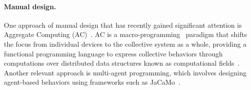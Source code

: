 \documentclass[12pt]{article}
\begin{document}
\paragraph{Manual design.}
One approach of manual design that has recently gained significant attention is 
 Aggregate Computing (AC)~\cite{DBLP:journals/jlap/ViroliBDACP19}. 
% 
AC is a macro-programming~\cite{DBLP:journals/csur/Casadei23} paradigm that shifts the focus from individual 
 devices to the collective system as a whole, providing a functional programming language to express collective 
 behaviors through computations over distributed data structures 
 known as computational fields~\cite{DBLP:journals/pervasive/MameiZL04,DBLP:journals/jlap/ViroliBDACP19}. 
%
Another relevant approach is multi-agent programming, which involves designing agent-based behaviors 
 using frameworks such as JaCaMo~\cite{boissier2020multi}.
\end{document}
